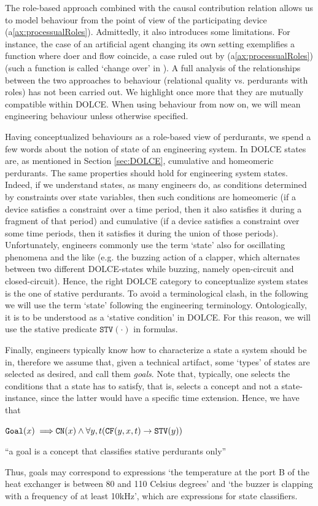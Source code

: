 \documentclass[sw]{iosart2x}
\newcommand{\bflist}{\begin{list}{}{\setlength{\topsep}{2mm}\setlength{\partopsep}{0mm}\setlength{\parsep}{0mm}\setlength{\leftmargin}{9mm}\setlength{\labelwidth}{8mm}}}
\newcommand{\eflist}{\end{list}}
\newcommand{\AxLabel}{\textrm{a}}
\newcounter{cntax}
\newcommand{\myax}[1]{\refstepcounter{cntax}\begin{small}{\bf \AxLabel\thecntax\label{ax:#1}}\end{small}}
\newcommand{\mytext}[1]{``#1''}
\newcommand{\refax}[1]{({\AxLabel}\ref{#1})}
\newcommand{\generalStyle}[1]{\texttt{#1}}
\newcommand{\uniRel}[2]{\generalStyle{#1}(#2)}
\newcommand{\triRel}[4]{\generalStyle{#1}(#2,#3,#4)}
\newcommand{\myfi}{\hspace{0.9mm} \Longrightarrow}
\newcommand{\DOLCE}{\textsc{DOLCE}\xspace} %
\newcommand{\DOLCEStative}[1]{\uniRel{{STV}}{#1}}
\newcommand{\DOLCEConcept}[1]{\uniRel{{CN}}{#1}}
\newcommand{\DOLCECLby}[3]{\triRel{CF}{#1}{#2}{#3}}
\newcommand{\Goal}[1]{\uniRel{Goal}{#1}}
\newcommand{\firstTimeKeyWord}[1]{\textit{#1}}
\newcommand{\quotes}[1]{`#1'}
\begin{document}
The role-based approach combined with the causal contribution relation allows us to model behaviour from the point of view of the participating device 
\refax{ax:processualRoles}. Admittedly, it also introduces some limitations. For instance, the case of an artificial agent changing its own setting exemplifies a function where doer and flow coincide, a case ruled out by \refax{ax:processualRoles} (such a function is called `change over' in \cite{borgoKnowledgebasedAdaptiveAgents2019}).
A full analysis of the relationships between the two approaches to behaviour (relational quality vs. perdurants with roles) has not been carried out. We highlight once more that they are mutually compatible within \DOLCE. When using behaviour from now on, we will mean engineering behaviour unless otherwise specified.


Having conceptualized behaviours as a role-based view of perdurants, we spend a few words about the notion of state of an engineering system.
In \DOLCE states are, as mentioned in Section \ref{sec:DOLCE}, cumulative and homeomeric perdurants.
The same properties should hold for engineering system states.
Indeed, if we understand states, as many engineers do, as conditions determined by constraints over state variables, then such conditions are homeomeric (if a device satisfies a constraint over a time period, then it also satisfies it during a fragment of that period) and cumulative (if a device satisfies a constraint over some time periods, then it satisfies it during the union of those periods).
Unfortunately, engineers commonly use the term \quotes{state} also for oscillating phenomena and the like (e.g. the buzzing action of a clapper, which alternates between two different \DOLCE-states while buzzing, namely open-circuit and closed-circuit). 
Hence, the right \DOLCE category to conceptualize system states is the one of stative perdurants. 
To avoid a terminological clash, in the following we will use the term \quotes{state} following the engineering terminology. Ontologically, it is to be understood as a \quotes{stative condition} in \DOLCE. For this reason, we will use the stative predicate $\DOLCEStative{\cdot}$ in formulas.

Finally, engineers typically know how to characterize a state a system should be in, therefore we assume that, given a technical artifact, some `types' of states are selected as desired, and call them \firstTimeKeyWord{goals}. Note that, typically, one selects the conditions that a state has to satisfy, that is, selects a concept 
and not a state-instance, since the latter would have a specific time extension. 
Hence, we have that
\bflist
\item[\myax{goalSubsum}] $ \Goal{x} \myfi \DOLCEConcept{x} \land \forall y,t (\DOLCECLby{y}{x}{t} \to \DOLCEStative{y})$
  \item \mytext{a goal is a concept that classifies stative perdurants only}
\eflist
Thus, goals may correspond to expressions \quotes{the temperature at the port B of the heat exchanger is between 80 and 110 Celsius degrees} and \quotes{the buzzer is clapping with a frequency of at least 10kHz}, which are expressions for state classifiers.
\end{document}

